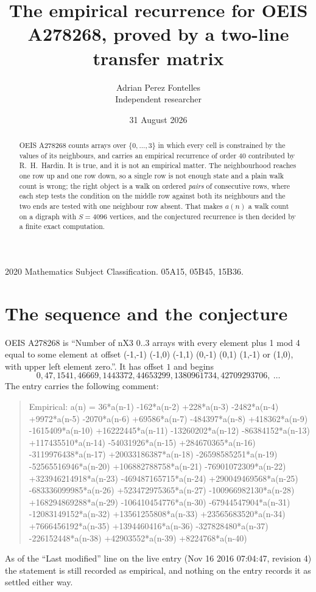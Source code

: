 \documentclass[11pt,a4paper]{article}
\title{The empirical recurrence for OEIS A278268, proved by a two-line transfer matrix}
\author{Adrian Perez Fontelles\\ \small Independent researcher}
\date{31 August 2026}
\theoremstyle{plain}
\theoremstyle{definition}
\begin{document}
\maketitle

\begin{abstract}
OEIS A278268 counts arrays over $\{0,\dots,3\}$ in which every cell is constrained by the
values of its neighbours, and carries an empirical recurrence of order $40$ contributed
by R.~H.~Hardin. It is true, and it is not an empirical matter. The neighbourhood reaches one
row up and one row down, so a single row is not enough state and a plain walk count
is wrong; the right object is a walk on ordered \emph{pairs} of consecutive rows, where
each step tests the condition on the middle row against both its neighbours and the two
ends are tested with one neighbour row absent. That makes $a(n)$ a walk count on a digraph
with $S=4096$ vertices, and the conjectured recurrence is then decided by a finite exact
computation.
\end{abstract}

\noindent\small 2020 Mathematics Subject Classification. 05A15, 05B45, 15B36.\normalsize

\section{The sequence and the conjecture}

OEIS A278268 is ``Number of nX3 0..3 arrays with every element plus 1 mod 4 equal to some element at offset (-1,-1) (-1,0) (-1,1) (0,-1) (0,1) (1,-1) or (1,0), with upper left element zero.''. It has offset $1$ and begins
\[
0, 47, 1541, 46669, 1443372, 44653299, 1380961734, 42709293706,\ \dots
\]
The entry carries the following comment:
\begin{quote}\small
Empirical: a(n) = 36*a(n-1) -162*a(n-2) +228*a(n-3) -2482*a(n-4) +9972*a(n-5) -2070*a(n-6) +69586*a(n-7) -484397*a(n-8) +418362*a(n-9) -1615409*a(n-10) +16222445*a(n-11) -13260202*a(n-12) -86384152*a(n-13) +117435510*a(n-14) -54031926*a(n-15) +284670365*a(n-16) -3119976438*a(n-17) +20033186387*a(n-18) -26598585251*a(n-19) -52565516946*a(n-20) +106882788758*a(n-21) -76901072309*a(n-22) +323946214918*a(n-23) -469487165715*a(n-24) +290049469568*a(n-25) -683336099985*a(n-26) +523472975365*a(n-27) -100966982130*a(n-28) +168294869288*a(n-29) -106410454776*a(n-30) -67944547904*a(n-31) -12083149152*a(n-32) +13561255808*a(n-33) +23565683520*a(n-34) +7666456192*a(n-35) +1394460416*a(n-36) -327828480*a(n-37) -226152448*a(n-38) +42903552*a(n-39) +8224768*a(n-40)
\end{quote}
As of the ``Last modified'' line on the live entry (Nov 16 2016 07:04:47, revision 4) the statement is
still recorded as empirical, and nothing on the entry records it as settled either way.
\end{document}
